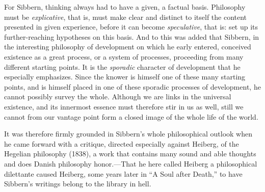 \documentclass[12pt,a4paper]{book}
\newcommand{\opage}[1]{\marginnote{\footnotesize\textit{[#1]}}}
\begin{document}
For Sibbern, thinking always had to have a given, a factual basis.
Philosophy must be
\opage{22}\textit{explicative}, that is, must make clear and distinct to itself the
content presented in given experience, before it can become
\textit{speculative}, that is: set up its further-reaching hypotheses on
this basis. And to this was added that Sibbern, in the interesting
philosophy of development on which he early entered, conceived existence
as a great process, or a system of processes, proceeding from many
different starting points. It is the \textit{sporadic} character of
development that he especially emphasizes. Since the knower is himself
one of these many starting points, and is himself placed in one of these
sporadic processes of development, he cannot possibly survey the whole.
Although we are links in the universal existence, and its innermost
essence must therefore stir in us as well, still we cannot from our
vantage point form a closed image of the whole life of the world.

It was therefore firmly grounded in Sibbern's whole philosophical outlook
when he came forward with a critique, directed especially against
Heiberg, of the Hegelian philosophy (1838), a work that contains many
sound and able thoughts and does Danish philosophy honor.---That he here
called Heiberg a philosophical dilettante caused Heiberg, some years later
in ``A Soul after Death,'' to have Sibbern's writings belong to the library
in hell.
\end{document}
